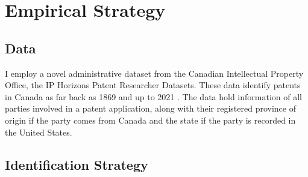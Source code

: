 \documentclass[class=article, crop=false]{standalone}
\begin{document}
\section{Empirical Strategy}

\subsection{Data}

I employ a novel administrative dataset from the Canadian Intellectual Property Office, the IP Horizons Patent Researcher Datasets. These data identify patents in Canada as far back as 1869 and up to 2021 \parencite{patents_cipo_datasets}. The data hold information of all parties involved in a patent application, along with their registered province of origin if the party comes from Canada and the state if the party is recorded in the United States.  

\subsection{Identification Strategy}
\end{document}

